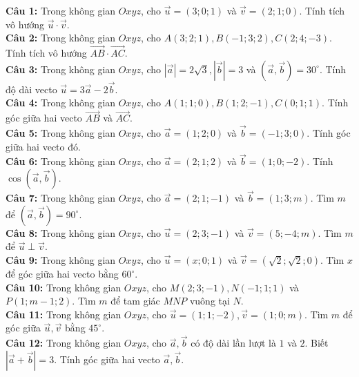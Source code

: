\documentclass[12pt]{article}
\begin{document}
	\begin{btxanh}
		\noindent \textbf{Câu 1:} Trong không gian $Oxyz$, cho $\vec{u} = (3; 0; 1)$ và $\vec{v} = (2; 1; 0)$. Tính tích vô hướng $\vec{u} \cdot \vec{v}$. \\
		\noindent \textbf{Câu 2:} Trong không gian $Oxyz$, cho $A(3; 2; 1), B(-1; 3; 2), C(2; 4; -3)$. Tính tích vô hướng $\vec{AB} \cdot \vec{AC}$. \\
		\noindent \textbf{Câu 3:} Trong không gian $Oxyz$, cho $|\vec{a}| = 2\sqrt{3}, |\vec{b}| = 3$ và $(\vec{a}, \vec{b}) = 30^\circ$. Tính độ dài vecto $\vec{u} = 3\vec{a} - 2\vec{b}$. \\
		\noindent \textbf{Câu 4:} Trong không gian $Oxyz$, cho $A(1; 1; 0), B(1; 2; -1), C(0; 1; 1)$. Tính góc giữa hai vecto $\vec{AB}$ và $\vec{AC}$. \\
		\noindent \textbf{Câu 5:} Trong không gian $Oxyz$, cho $\vec{a} = (1; 2; 0)$ và $\vec{b} = (-1; 3; 0)$. Tính góc giữa hai vecto đó. \\
		\noindent \textbf{Câu 6:} Trong không gian $Oxyz$, cho $\vec{a} = (2; 1; 2)$ và $\vec{b} = (1; 0; -2)$. Tính $\cos(\vec{a}, \vec{b})$. \\
		\noindent \textbf{Câu 7:} Trong không gian $Oxyz$, cho $\vec{a} = (2; 1; -1)$ và $\vec{b} = (1; 3; m)$. Tìm $m$ để $(\vec{a}, \vec{b}) = 90^\circ$. \\
		\noindent \textbf{Câu 8:} Trong không gian $Oxyz$, cho $\vec{u} = (2; 3; -1)$ và $\vec{v} = (5; -4; m)$. Tìm $m$ để $\vec{u} \perp \vec{v}$. \\
		\noindent \textbf{Câu 9:} Trong không gian $Oxyz$, cho $\vec{u} = (x; 0; 1)$ và $\vec{v} = (\sqrt{2}; \sqrt{2}; 0)$. Tìm $x$ để góc giữa hai vecto bằng $60^\circ$. \\
		\noindent \textbf{Câu 10:} Trong không gian $Oxyz$, cho $M(2; 3; -1), N(-1; 1; 1)$ và $P(1; m-1; 2)$. Tìm $m$ để tam giác $MNP$ vuông tại $N$. \\
		\noindent \textbf{Câu 11:} Trong không gian $Oxyz$, cho $\vec{u} = (1; 1; -2), \vec{v} = (1; 0; m)$. Tìm $m$ để góc giữa $\vec{u}, \vec{v}$ bằng $45^\circ$. \\
		\noindent \textbf{Câu 12:} Trong không gian $Oxyz$, cho $\vec{a}, \vec{b}$ có độ dài lần lượt là $1$ và $2$. Biết $|\vec{a} + \vec{b}| = 3$. Tính góc giữa hai vecto $\vec{a}, \vec{b}$.
	\end{btxanh}
\end{document}

